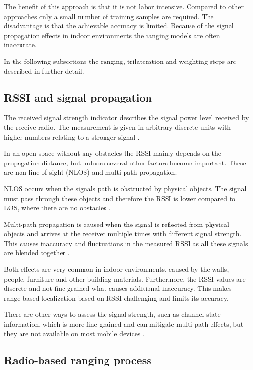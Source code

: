 The benefit of this approach is that it is not labor intensive. Compared to other approaches only a small number of training samples are required. The disadvantage is that the achievable accuracy is limited. Because of the signal propagation effects in indoor environments the ranging models are often inaccurate.

In the following subsections the ranging, trilateration and weighting steps are described in further detail.

\subsection{RSSI and signal propagation}

The received signal strength indicator describes the signal power level received by the receive radio. The measurement is given in arbitrary discrete units with higher numbers relating to a stronger signal \citep{RSSIwikipedia}.

In an open space without any obstacles the RSSI mainly depends on the propagation distance, but indoors several other factors become important. These are non line of sight (NLOS) and multi-path propagation.

NLOS occurs when the signals path is obstructed by physical objects. The signal must pass through these objects and therefore the RSSI is lower compared to LOS, where there are no obstacles \cite{JoseMaster}.

Multi-path propagation is caused when the signal is reflected from physical objects and arrives at the receiver multiple times with different signal strength. This causes inaccuracy and fluctuations in the measured RSSI as all these signals are blended together \cite{multipathEffects}.

Both effects are very common in indoor environments, caused by the walls, people, furniture and other building materials. Furthermore, the RSSI values are discrete and not fine grained what causes additional inaccuracy. This makes range-based localization based on RSSI challenging and limits its accuracy.

There are other ways to assess the signal strength, such as channel state information, which is more fine-grained and can mitigate multi-path effects, but they are not available on most mobile devices \cite{JoseMaster,FineGrainedIndoorTracking}.

\subsection{Radio-based ranging process}
\label{Ranging}

